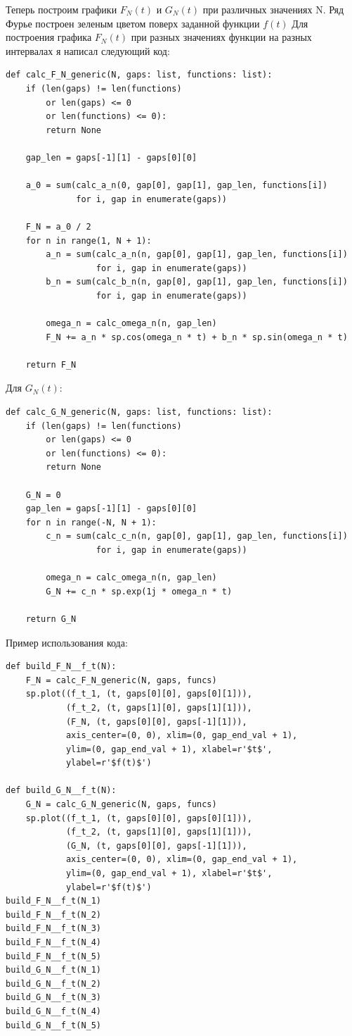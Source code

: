 \documentclass[a4paper, 16pt]{article}
\begin{document}
\noindent Теперь построим графики $F_N(t)$ и $G_N(t)$ при различных значениях N. Ряд Фурье
построен зеленым цветом поверх заданной функции $f(t)$
\newpage
\noindent Для построения графика $F_N(t)$ при разных значениях функции на разных интервалах я написал следующий код:
\begin{lstlisting}
def calc_F_N_generic(N, gaps: list, functions: list):
    if (len(gaps) != len(functions) 
        or len(gaps) <= 0 
        or len(functions) <= 0):
        return None

    gap_len = gaps[-1][1] - gaps[0][0]

    a_0 = sum(calc_a_n(0, gap[0], gap[1], gap_len, functions[i]) 
              for i, gap in enumerate(gaps))

    F_N = a_0 / 2
    for n in range(1, N + 1):
        a_n = sum(calc_a_n(n, gap[0], gap[1], gap_len, functions[i]) 
                  for i, gap in enumerate(gaps))
        b_n = sum(calc_b_n(n, gap[0], gap[1], gap_len, functions[i]) 
                  for i, gap in enumerate(gaps))

        omega_n = calc_omega_n(n, gap_len)
        F_N += a_n * sp.cos(omega_n * t) + b_n * sp.sin(omega_n * t)

    return F_N
\end{lstlisting}


\noindent Для $G_N(t)$:
\begin{lstlisting}
def calc_G_N_generic(N, gaps: list, functions: list):
    if (len(gaps) != len(functions) 
        or len(gaps) <= 0 
        or len(functions) <= 0):
        return None

    G_N = 0
    gap_len = gaps[-1][1] - gaps[0][0]
    for n in range(-N, N + 1):
        c_n = sum(calc_c_n(n, gap[0], gap[1], gap_len, functions[i]) 
                  for i, gap in enumerate(gaps))
        
        omega_n = calc_omega_n(n, gap_len)
        G_N += c_n * sp.exp(1j * omega_n * t)

    return G_N
\end{lstlisting}


\noindent Пример использования кода:
\begin{lstlisting}
def build_F_N__f_t(N):
    F_N = calc_F_N_generic(N, gaps, funcs)
    sp.plot((f_t_1, (t, gaps[0][0], gaps[0][1])), 
            (f_t_2, (t, gaps[1][0], gaps[1][1])), 
            (F_N, (t, gaps[0][0], gaps[-1][1])),
            axis_center=(0, 0), xlim=(0, gap_end_val + 1), 
            ylim=(0, gap_end_val + 1), xlabel=r'$t$', 
            ylabel=r'$f(t)$')

def build_G_N__f_t(N):
    G_N = calc_G_N_generic(N, gaps, funcs)
    sp.plot((f_t_1, (t, gaps[0][0], gaps[0][1])), 
            (f_t_2, (t, gaps[1][0], gaps[1][1])), 
            (G_N, (t, gaps[0][0], gaps[-1][1])),
            axis_center=(0, 0), xlim=(0, gap_end_val + 1), 
            ylim=(0, gap_end_val + 1), xlabel=r'$t$', 
            ylabel=r'$f(t)$')
build_F_N__f_t(N_1)
build_F_N__f_t(N_2)
build_F_N__f_t(N_3)
build_F_N__f_t(N_4)
build_F_N__f_t(N_5)
build_G_N__f_t(N_1)
build_G_N__f_t(N_2)
build_G_N__f_t(N_3)
build_G_N__f_t(N_4)
build_G_N__f_t(N_5)
\end{lstlisting}
\end{document}
